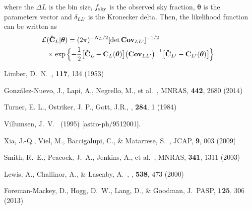 \documentclass[prd,showpacs,amsfonts,amssymb,amsmath, nofootinbib]{revtex4-1}
\begin{document}
%
where the $\Delta L$ is the bin size, $f_{\rm sky}$ is the observed sky fraction, $\boldsymbol{\theta}$ is the parameters vector and $\delta_{LL'}$ is the Kronecker delta.
Then, the likelihood function can be written as 
%
\begin{equation}
\begin{split}
\mathcal{L}&(\mathbf{\hat{C}}_{L}|\boldsymbol{\theta}) = (2\pi)^{-N_L/2} [\text{det}\, \textbf{Cov}_{LL'}]^{-1/2} \\ 
&\times \exp{ \Bigl\{ -\frac{1}{2} \bigl[ \mathbf{\hat{C}}_{L} - \mathbf{C}_{L}(\boldsymbol{\theta})  \bigr] \bigl(\textbf{Cov}_{LL'}\bigr)^{-1} \bigl[ \mathbf{\hat{C}}_{L'} - \mathbf{C}_{L'}(\boldsymbol{\theta})  \bigr]  \Bigr\}}.
\end{split}
\end{equation}

%


\begin{thebibliography}{99}

Limber, D.~N.\, \apj, {\bf 117}, 134 (1953)

Gonz{\'a}lez-Nuevo, J., Lapi, A., Negrello, M., et al.\ , MNRAS, {\bf 442}, 2680 (2014)

Turner, E. L., Ostriker, J. P., Gott, J.R.,  \apj, {\bf 284}, 1 (1984)
  
  Villumsen, J.~V. \ (1995)  [astro-ph/9512001].

Xia, J.-Q., Viel, M., Baccigalupi, C., \& Matarrese, S.\ , JCAP, {\bf 9}, 003  (2009)

Smith, R.~E., Peacock, J.~A., Jenkins, A., et al.\ , MNRAS, {\bf 341}, 1311 (2003)

 Lewis, A., Challinor, A., \& Lasenby, A.\ , \apj, {\bf 538}, 473 (2000)

Foreman-Mackey, D., Hogg, D.~W., Lang, D., \& Goodman, J.\, PASP, {\bf 125}, 306 (2013)


\end{thebibliography}
\end{document}
